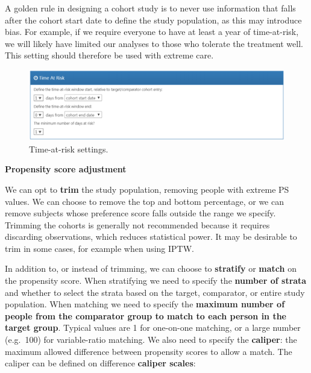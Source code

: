 \documentclass[11pt]{book}
\theoremstyle{definition}
\theoremstyle{definition}
\theoremstyle{definition}
\theoremstyle{remark}
\let\BeginKnitrBlock\begin \let\EndKnitrBlock\end
\begin{document}
\BeginKnitrBlock{rmdimportant}
A golden rule in designing a cohort study is to never use information that falls after the cohort start date to define the study population, as this may introduce bias. For example, if we require everyone to have at least a year of time-at-risk, we will likely have limited our analyses to those who tolerate the treatment well. This setting should therefore be used with extreme care.
\EndKnitrBlock{rmdimportant}

\begin{figure}

{\centering \includegraphics[width=1\linewidth]{images/PopulationLevelEstimation/timeAtRisk} 

}

\caption{Time-at-risk settings.}\label{fig:timeAtRisk}
\end{figure}

\textbf{Propensity score adjustment}

We can opt to \textbf{trim} the study population, removing people with extreme PS values. We can choose to remove the top and bottom percentage, or we can remove subjects whose preference score falls outside the range we specify. Trimming the cohorts is generally not recommended because it requires discarding observations, which reduces statistical power. It may be desirable to trim in some cases, for example when using IPTW. 

In addition to, or instead of trimming, we can choose to \textbf{stratify} or \textbf{match} on the propensity score. When stratifying we need to specify the \textbf{number of strata} and whether to select the strata based on the target, comparator, or entire study population. When matching we need to specify the \textbf{maximum number of people from the comparator group to match to each person in the target group}. Typical values are 1 for one-on-one matching, or a large number (e.g.~100) for variable-ratio matching. We also need to specify the \textbf{caliper}: the maximum allowed difference between propensity scores to allow a match. The caliper can be defined on difference \textbf{caliper scales}: 
\end{document}
